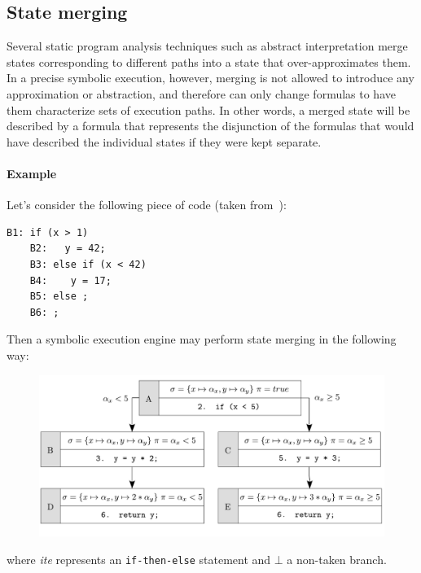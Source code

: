 \subsection{State merging}

Several static program analysis techniques such as abstract interpretation merge states corresponding to different paths into a state that over-approximates them. In a precise symbolic execution, however, merging is not allowed to introduce any approximation or abstraction, and therefore can only change formulas to have them characterize sets of execution paths. In other words, a merged state will be described by a formula that represents the disjunction of the formulas that would have described the individual states if they were kept separate.

\paragraph{Example} Let's consider the following piece of code (taken from~\cite{VERITESTING-ICSE14}):
    \begin{lstlisting}[basicstyle=\ttfamily\small]
    B1: if (x > 1) 
    B2:   y = 42;
    B3: else if (x < 42) 
    B4:    y = 17;
    B5: else ;
    B6: ;
    \end{lstlisting}
Then a symbolic execution engine may perform state merging in the following way:
\begin{figure}[H]
  \centering
  \vspace{-3mm}
  \includegraphics[width=0.65\columnwidth]{images/state-merging} 
  \vspace{-3mm}
\end{figure}
\noindent where {\em ite} represents an {\tt if-then-else} statement and $\bot$ a non-taken branch.

